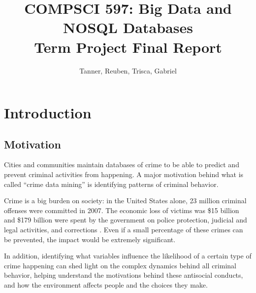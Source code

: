\documentclass[a4paper,10pt]{article}
\title{{\large{COMPSCI 597: Big Data and NOSQL Databases}}\\Term Project Final Report}
\author{Tanner, Reuben, Trisca, Gabriel}
\begin{document}
\maketitle

\tableofcontents

\newpage

\section{Introduction}
\subsection{Motivation}
Cities and communities maintain databases of crime to be able to predict and prevent criminal activities from happening. A major motivation behind what is called “crime data mining” \cite{Blockeel2013} is identifying patterns of criminal behavior\cite{Chen2004}. 

Crime is a big burden on society: in the United States alone, 23 million criminal offenses were committed in 2007. The economic loss of victims was \$15 billion and \$179 billion were spent by the government on police protection, judicial and legal activities, and corrections \cite{Justice2008}. Even if a small percentage of these crimes can be prevented, the impact would be extremely significant\cite{Syam2006}.

In addition, identifying what variables influence the likelihood of a certain type of crime happening can shed light on the complex dynamics behind all criminal behavior, helping understand the motivations behind these antisocial conducts, and how the environment affects people and the choices they make\cite{BUSS2012}.
\end{document}
